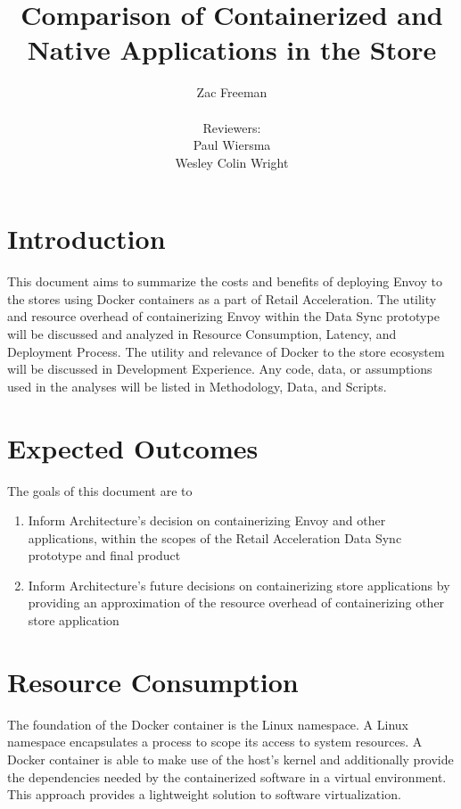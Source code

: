 \documentclass{article}
\begin{document}
\title{Comparison of Containerized and Native Applications in the Store}
\author{Zac Freeman\\\\Reviewers:\\Paul Wiersma\\ Wesley Colin Wright}

\maketitle

\section{Introduction}
This document aims to summarize the costs and benefits of deploying Envoy to the stores using Docker containers as a part of Retail Acceleration. The utility and resource overhead of containerizing Envoy within the Data Sync prototype will be discussed and analyzed in Resource Consumption, Latency, and Deployment Process. The utility and relevance of Docker to the store ecosystem will be discussed in Development Experience. Any code, data, or assumptions used in the analyses will be listed in Methodology, Data, and Scripts.

\section{Expected Outcomes}
The goals of this document are to
\begin{enumerate}
    \item Inform Architecture's decision on containerizing Envoy and other applications, within the scopes of the Retail Acceleration Data Sync prototype and final product
    \item Inform Architecture's future decisions on containerizing store applications by providing an approximation of the resource overhead of containerizing other store application
\end{enumerate}

\section{Resource Consumption}
The foundation of the Docker container is the Linux namespace. A Linux namespace encapsulates a process to scope its access to system resources. A Docker container is able to make use of the host's kernel and additionally provide the dependencies needed by the containerized software in a virtual environment. This approach provides a lightweight solution to software virtualization.
\end{document}
